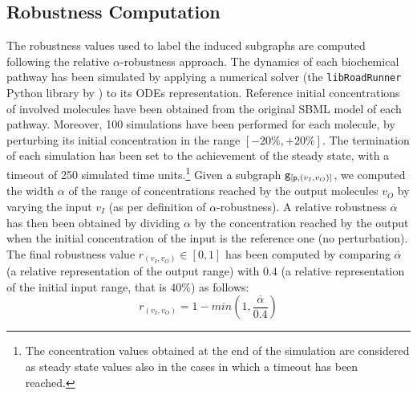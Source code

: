 \subsection{Robustness Computation}\label{sec:robustness-computation}
The robustness values used to label the induced subgraphs are computed following the relative $\alpha$-robustness approach. The dynamics of each biochemical pathway has been simulated by applying a numerical solver (the \texttt{libRoadRunner} Python library by \citet{somogyi2015libroadrunner}) to its ODEs representation. Reference initial concentrations of involved molecules have been obtained from the original SBML model of each pathway. Moreover, 100 simulations have been performed for each molecule, by perturbing its initial concentration in the range $[-20\%,+20\%]$. The termination of each simulation has been set to the achievement of the steady state, with a timeout of 250 simulated time units.\footnote{The concentration values obtained at the end of the simulation are considered as steady state values also in the cases in which a timeout has been reached.} Given a subgraph $\mathtt{g}_{[\mathtt{p}, (v_I,v_O)]}$, we computed the width $\alpha$ of the range of concentrations reached by the output molecules $v_O$ by varying the input $v_I$ (as per definition of $\alpha$-robustness). A relative robustness $\overline{\alpha}$ has then been obtained by dividing $\alpha$ by the concentration reached by the output when the initial concentration of the input is the reference one (no perturbation). The final robustness value $r_{(v_I,v_O)} \in [0,1]$ has been computed by comparing $\overline{\alpha}$ (a relative representation of the output range) with $0.4$ (a relative representation of the initial input range, that is $40\%$) as follows:
\[
    r_{(v_I,v_O)} = 1 - min (1,\frac{\overline{\alpha}}{0.4})
\]

